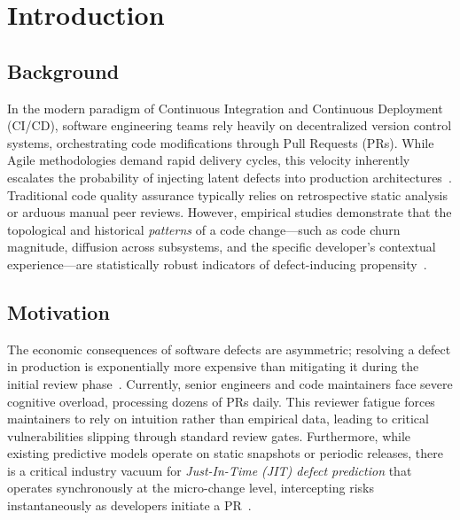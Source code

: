 \documentclass[12pt, a4paper]{article}
\begin{document}
\clearpage
{}
\tableofcontents

\clearpage
\section{Introduction}

\subsection{Background}
In the modern paradigm of Continuous Integration and Continuous Deployment (CI/CD), software engineering teams rely heavily on decentralized version control systems, orchestrating code modifications through Pull Requests (PRs). While Agile methodologies demand rapid delivery cycles, this velocity inherently escalates the probability of injecting latent defects into production architectures~\cite{mcintosh2014}. Traditional code quality assurance typically relies on retrospective static analysis or arduous manual peer reviews. However, empirical studies demonstrate that the topological and historical \textit{patterns} of a code change---such as code churn magnitude, diffusion across subsystems, and the specific developer's contextual experience---are statistically robust indicators of defect-inducing propensity~\cite{kamei2013}.

\subsection{Motivation}
The economic consequences of software defects are asymmetric; resolving a defect in production is exponentially more expensive than mitigating it during the initial review phase~\cite{boehm2001}. Currently, senior engineers and code maintainers face severe cognitive overload, processing dozens of PRs daily. This reviewer fatigue forces maintainers to rely on intuition rather than empirical data, leading to critical vulnerabilities slipping through standard review gates. Furthermore, while existing predictive models operate on static snapshots or periodic releases, there is a critical industry vacuum for \textit{Just-In-Time (JIT) defect prediction} that operates synchronously at the micro-change level, intercepting risks instantaneously as developers initiate a PR~\cite{kamei2013, kondo2020}.
\end{document}
